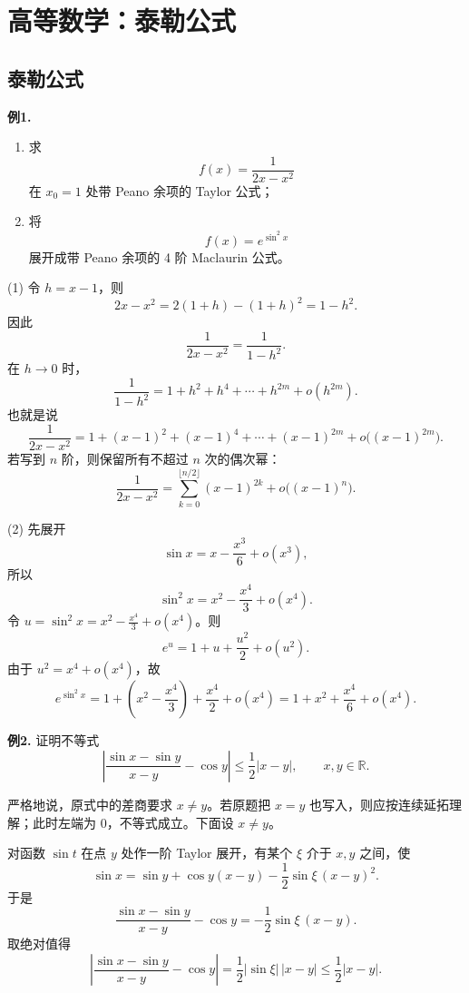 \chapter{高等数学：泰勒公式}

\section{泰勒公式}

\begin{problemblock}
\textbf{例1.}
\begin{enumerate}[label=(\arabic*), leftmargin=2.2em]
\item 求
\[
f(x)=\frac1{2x-x^2}
\]
在 \(x_0=1\) 处带 Peano 余项的 Taylor 公式；
\item 将
\[
f(x)=e^{\sin^2x}
\]
展开成带 Peano 余项的 4 阶 Maclaurin 公式。
\end{enumerate}
\end{problemblock}
\begin{solutionblock}
(1) 令 \(h=x-1\)，则
\[
2x-x^2=2(1+h)-(1+h)^2=1-h^2.
\]
因此
\[
\frac1{2x-x^2}=\frac1{1-h^2}.
\]
在 \(h\to0\) 时，
\[
\frac1{1-h^2}=1+h^2+h^4+\cdots+h^{2m}+o(h^{2m}).
\]
也就是说
\[
\frac1{2x-x^2}
=1+(x-1)^2+(x-1)^4+\cdots+(x-1)^{2m}
 +o\bigl((x-1)^{2m}\bigr).
\]
若写到 \(n\) 阶，则保留所有不超过 \(n\) 次的偶次幂：
\[
\frac1{2x-x^2}
=\sum_{k=0}^{\lfloor n/2\rfloor}(x-1)^{2k}+o\bigl((x-1)^n\bigr).
\]

(2) 先展开
\[
\sin x=x-\frac{x^3}{6}+o(x^3),
\]
所以
\[
\sin^2x=x^2-\frac{x^4}{3}+o(x^4).
\]
令 \(u=\sin^2x=x^2-\frac{x^4}{3}+o(x^4)\)。则
\[
e^u=1+u+\frac{u^2}{2}+o(u^2).
\]
由于 \(u^2=x^4+o(x^4)\)，故
\[
e^{\sin^2x}
=1+\left(x^2-\frac{x^4}{3}\right)+\frac{x^4}{2}+o(x^4)
=1+x^2+\frac{x^4}{6}+o(x^4).
\]
\end{solutionblock}

\begin{problemblock}
\textbf{例2.} 证明不等式
\[
\left|
\frac{\sin x-\sin y}{x-y}-\cos y
\right|
\le\frac12|x-y|,
\qquad x,y\in\mathbb R.
\]
\end{problemblock}
\begin{solutionblock}
严格地说，原式中的差商要求 \(x\ne y\)。若原题把 \(x=y\) 也写入，则应按连续延拓理解；此时左端为 \(0\)，不等式成立。下面设 \(x\ne y\)。

对函数 \(\sin t\) 在点 \(y\) 处作一阶 Taylor 展开，有某个 \(\xi\) 介于 \(x,y\) 之间，使
\[
\sin x=\sin y+\cos y(x-y)-\frac12\sin\xi\,(x-y)^2.
\]
于是
\[
\frac{\sin x-\sin y}{x-y}-\cos y
=-\frac12\sin\xi\,(x-y).
\]
取绝对值得
\[
\left|
\frac{\sin x-\sin y}{x-y}-\cos y
\right|
=\frac12|\sin\xi|\,|x-y|
\le\frac12|x-y|.
\]
\end{solutionblock}

